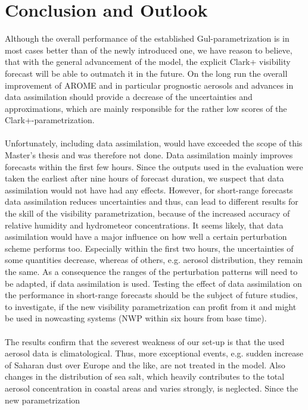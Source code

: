 \chapter{Conclusion and Outlook}
\label{sec:con_n_out}
Although the overall performance of the established Gul-parametrization is in most cases better than of the newly introduced one, we have reason to believe, that with the general advancement of the model, the explicit Clark+ visibility forecast will be able to outmatch it in the future. On the long run the overall improvement of AROME and in particular prognostic aerosols and advances in data assimilation should provide a decrease of the uncertainties and approximations, which are mainly responsible for the rather low scores of the Clark+-parametrization.\\ \\
Unfortunately, including data assimilation, would have exceeded the scope of this Master's thesis and was therefore not done. Data assimilation mainly improves forecasts within the first few hours. Since the outputs used in the evaluation were taken the earliest after nine hours of forecast duration, we suspect that data assimilation would not have had any effects.
However, for short-range forecasts data assimilation reduces uncertainties and thus, can lead to different results for the skill of the visibility parametrization, because of the increased accuracy of relative humidity and hydrometeor concentrations. It seems likely, that data assimilation would have a major influence on how well a certain perturbation scheme performs too. Especially within the first two hours, the uncertainties of some quantities decrease, whereas of others, e.g. aerosol distribution, they remain the same. As a consequence the ranges of the perturbation patterns will need to be adapted, if data assimilation is used. Testing the effect of data assimilation on the performance in short-range forecasts should be the subject of future studies, to investigate, if the new visibility parametrization can profit from it and might be used in nowcasting systems (NWP within six hours from base time). \\ \\
The results confirm that the severest weakness of our set-up is that the used aerosol data is climatological. Thus, more exceptional events, e.g. sudden increase of Saharan dust over Europe and the like, are not treated in the model. Also changes in the distribution of sea salt, which heavily contributes to the total aerosol concentration in coastal areas and varies strongly, is neglected. Since the new parametrization
